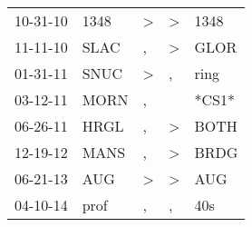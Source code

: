 \begin{supertabular}{lllll}
 10-31-10 &  1348 &  \textgreater &  \textgreater &   1348 \\
 11-11-10 &  SLAC &             , &  \textgreater &   GLOR \\
 01-31-11 &  SNUC &  \textgreater &             , &   ring \\
 03-12-11 &  MORN &             , &               &  *CS1* \\
 06-26-11 &  HRGL &             , &  \textgreater &   BOTH \\
 12-19-12 &  MANS &             , &  \textgreater &   BRDG \\
 06-21-13 &   AUG &  \textgreater &  \textgreater &    AUG \\
 04-10-14 &  prof &             , &             , &    40s \\
\end{supertabular}
